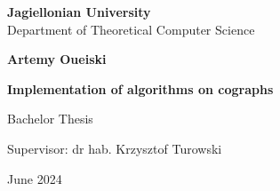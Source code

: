 \begin{titlepage}
	\begin{center}
        
		\large
		\textbf{Jagiellonian University}\\
		Department of Theoretical Computer Science\\

		\vspace{1.5cm}

		\Large
		\textbf{Artemy Oueiski}

		\vspace*{2cm}

		\textbf{\LARGE Implementation of algorithms on cographs}
		
		\vspace{0.5cm}
		\large
		
		\vfill
		\Large
		Bachelor Thesis

		\vfill
		\Large
		Supervisor: dr hab. Krzysztof Turowski
		
		\vspace{0.8cm}
		
		  June 2024
		
\end{center}
\end{titlepage}